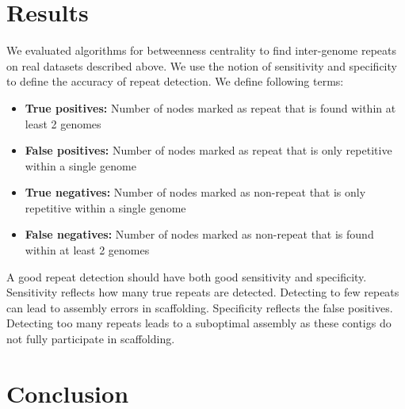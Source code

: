 \documentclass[runningheads,a4paper]{llncs}
\begin{document}
\section{Results} 
We evaluated algorithms for betweenness centrality to find inter-genome repeats on real datasets described above. We use the notion of sensitivity and specificity to define the accuracy of repeat detection. We define following terms:
\begin{itemize}
\item \textbf{True positives:} Number of nodes marked as repeat that is found within at least 2 genomes
\item \textbf{False positives:} Number of nodes marked as repeat that is only repetitive within a single genome
\item \textbf{True negatives:} Number of nodes marked as non-repeat that is only repetitive within a single genome
\item \textbf{False negatives:} Number of nodes marked as non-repeat that is found within at least 2 genomes
\end{itemize}

A good repeat detection should have both good sensitivity and specificity. Sensitivity reflects how many true repeats are detected. Detecting to few repeats can lead to assembly errors in scaffolding. Specificity reflects the false positives. Detecting too many repeats leads to a suboptimal assembly as these contigs do not fully participate in scaffolding. 

\section{Conclusion}

{}

\end{document}
